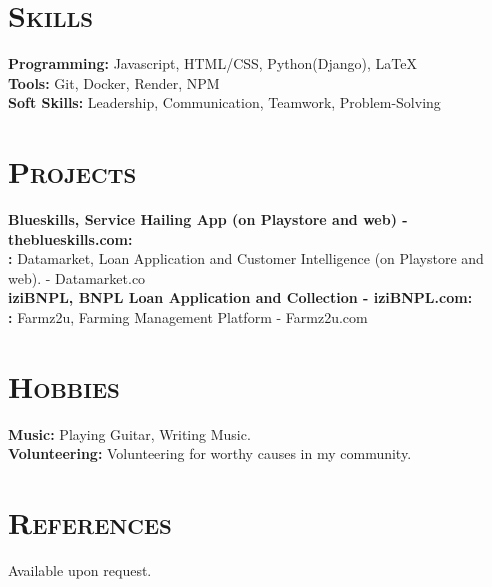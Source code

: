 \documentclass[a4paper,10pt]{article}
\newcommand{\cvsection}[1]{\section*{\scshape{#1}}}
\newcommand{\cvitem}[2]{\textbf{#1:} #2\\}
\begin{document}
\cvsection{Skills}
\cvitem{Programming}{Javascript, HTML/CSS, Python(Django), LaTeX}
\cvitem{Tools}{Git, Docker, Render, NPM}
\cvitem{Soft Skills}{Leadership, Communication, Teamwork, Problem-Solving}

\cvsection{Projects}
\cvitem{Blueskills, Service Hailing App (on Playstore and web) - theblueskills.com}
\cvitem{Datamarket, Loan Application and Customer Intelligence (on Playstore and web). - Datamarket.co}
\cvitem{iziBNPL, BNPL Loan Application and Collection - iziBNPL.com}
\cvitem{Farmz2u, Farming Management Platform - Farmz2u.com}

\cvsection{Hobbies}
\cvitem{Music}{Playing Guitar, Writing Music.}
\cvitem{Volunteering}{Volunteering for worthy causes in my community.}

\cvsection{References}
Available upon request.
\end{document}
